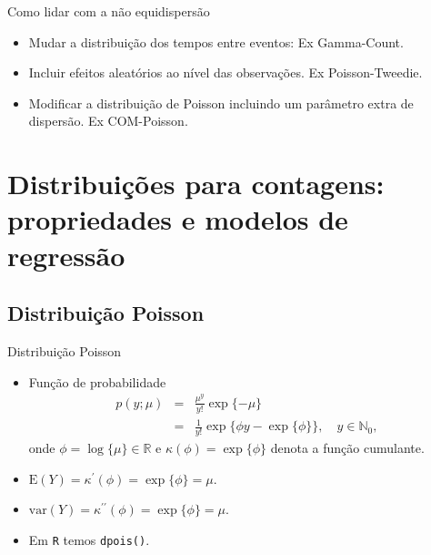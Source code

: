 \documentclass[10pt, aspectratio=169]{beamer}\usepackage[]{graphicx}\usepackage[]{color}
\begin{document}
\begin{frame}{Como lidar com a não equidispersão}
\begin{itemize}
\item Mudar a distribuição dos tempos entre eventos: Ex Gamma-Count. 
\vspace{0,5cm}
\item Incluir efeitos aleatórios ao nível das observações. Ex Poisson-Tweedie.
\vspace{0,5cm}
\item Modificar a distribuição de Poisson incluindo um parâmetro extra
de dispersão. Ex COM-Poisson.
\end{itemize}
\end{frame}

\section{Distribuições para contagens: propriedades e modelos de regressão}
\label{Section2}




\subsection{Distribuição Poisson}

\begin{frame}{Distribuição Poisson}
\begin{itemize}
\item Função de probabilidade
\begin{eqnarray}
p(y;\mu) &=& \frac{\mu^y}{y!}\exp\{-\mu\} \nonumber \\
	     &=& \frac{1}{y!} \exp \{\phi y -  \exp\{\phi\} \}, \quad y \in \mathbb{N}_{0},
\end{eqnarray}
onde $\phi = \log \{\mu\} \in \mathbb{R}$ e $\kappa(\phi) = \exp\{\phi\}$
denota a função cumulante.
\vspace{0,5cm}
\item $\mathrm{E}(Y) = \kappa^{\prime}(\phi) = \exp\{\phi\} = \mu$. 
\vspace{0,5cm}
\item $\mathrm{var}(Y) = \kappa^{\prime \prime}(\phi) = \exp\{\phi\} = \mu$.
\vspace{0,5cm}
\item Em \texttt{R} temos \texttt{dpois()}.

\end{itemize}
\end{frame}
\end{document}
